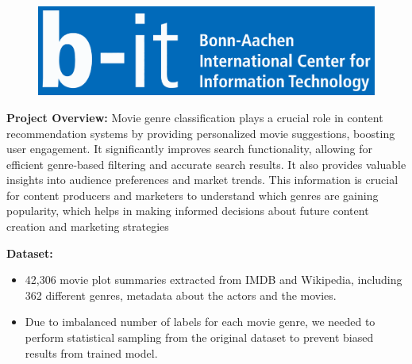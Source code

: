 \documentclass[hbrs-poster.tex]{subfiles}
\begin{document}
    {
        \begin{figure}
            \vspace{-1cm}
            \begin{tikzfigure}
                \includegraphics[scale=0.225]{figures/b-it.pdf}
            \end{tikzfigure}
        \end{figure}
    
        \textbf{Project Overview:}
        Movie genre classification plays a crucial role in content recommendation systems by providing personalized movie suggestions, boosting user engagement. It significantly improves search functionality, allowing for efficient genre-based filtering and accurate search results. 
        It also provides valuable insights into audience preferences and market trends. This information is crucial for content producers and marketers to understand which genres are gaining popularity, which helps in making informed decisions about future content creation and marketing strategies
        
        
        \textbf{Dataset:}
        \begin{itemize}
            \item 42,306 movie plot summaries extracted from IMDB and Wikipedia,
            including 362 different genres, metadata about the actors and the movies. 
            \item Due to imbalanced number of labels for each movie genre, we needed to perform statistical sampling from the original dataset to prevent biased results from trained model.
            
        \end{itemize}
    


    
    }
\end{document}
